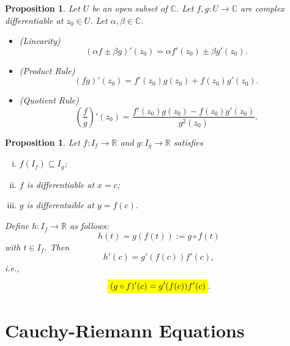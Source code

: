 \documentclass[12pt,openany]{book}
\newcommand{\mathcolorbox}[2]{\colorbox{#1}{$\displaystyle #2$}}
\newtheorem{proposition}[theorem]{Proposition}
\theoremstyle{definition}
\newcommand{\R}{\mathbb{R}}
\newcommand{\C}{\mathbb{C}}
\newcommand{\ie}{\textnormal{i.e.}}
\begin{document}
	
	\begin{tcolorbox}[colframe=procolor, title={\color{white}\bf }]
		\begin{proposition}
			Let $U$ be an open subset of $\C$. Let $f,g:U\to\C$ are complex differentiable at $z_0\in U$. Let $\alpha,\beta\in\C$. \begin{itemize}
				\item (Linearity) \[
				\left(\alpha f\pm\beta g\right)'(z_0)=\alpha f'(z_0)\pm\beta g'(z_0).
				\]
				\item (Product Rule) \[
				\left(fg\right)'(z_0)=f'(z_0)g(z_0)+f(z_0)g'(z_0).
				\]
				\item (Quotient Rule) \[
				\left(\frac{f}{g}\right)'(z_0)=\frac{f'(z_0)g(z_0)-f(z_0)g'(z_0)}{g^2(z_0)}.
				\]
			\end{itemize}
		\end{proposition}
	\end{tcolorbox}
	\vspace{8pt}
	\begin{tcolorbox}[colframe=procolor, title={\color{white}\bf Chain Rule}]
		\begin{proposition}
			Let $f:I_f\to\R$ and $g:I_g\to\R$ satisfies \begin{enumerate}[(i)]
				\item $f(I_f)\subseteq I_g$;
				\item $f$ is differentiable at $x=c$;
				\item $g$ is differentaible at $y=f(c)$.
			\end{enumerate} Define $h:I_f\to\R$ as follows: \[
			h(t)=g(f(t)):=g\circ f(t)
			\] with $t\in I_f$. Then \[
			h'(c)=g'(f(c))f'(c),
			\] \ie, \[
			\mathcolorbox{-blue}{(g\circ f)'(c)=g'(f(c))f'(c)}.
			\]
		\end{proposition}
	\end{tcolorbox}
	
	\newpage
	\section{Cauchy-Riemann Equations}
	
\end{document}
